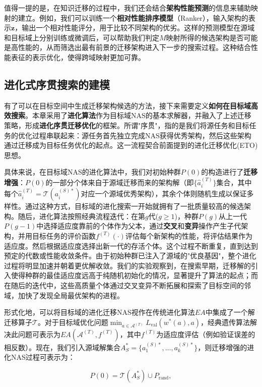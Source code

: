 \documentclass[../main.tex]{subfiles}
\begin{document}
值得一提的是，在知识迁移的过程中，我们还会结合\textbf{架构性能预测}的信息来辅助映射的建立。例如，我们可以训练一个\textbf{相对性能排序模型}（Ranker），输入架构的表示$\mathbf{z}$，输出一个相对性能评分，用于比较不同架构的优劣。这样的预测模型在源域和目标域上分别训练或微调后，可以帮助我们判定$M$映射所得的候选架构是否可能是高性能的，从而筛选出最有前景的迁移架构进入下一步的搜索过程。这种结合性能表征的表示优化，使得跨域映射更加可靠。

\subsection{进化式序贯搜索的建模}

有了可以在目标空间中生成迁移架构候选的方法，接下来需要定义\textbf{如何在目标域高效搜索}。本章采用了\textbf{进化算法}作为目标域NAS的基本求解器，并融入了上述迁移策略，形成\textbf{进化序贯迁移优化}的框架。所谓"序贯"，指的是我们将源任务和目标任务的优化过程串联起来：源任务首先独立完成NAS获得优秀架构，然后这些架构通过迁移成为目标任务优化的起点。这一流程契合前面提到的进化迁移优化(ETO)思想。

具体来说，在目标域NAS的进化算法中，我们对初始种群$P(0)$的构造进行了\textbf{迁移增强}：$P(0)$的一部分个体来自于源域迁移而来的架构解（即$\{\hat{a}^{(T)}_i\}$集合，其中每个$\hat{a}^{(T)}_i = \mathcal{T}(a^{(S)*}_i)$对应一个源域优秀架构），其余个体则随机生成以保证多样性。通过这种方式，目标域的进化搜索一开始就拥有了一批质量较高的候选架构。随后，进化算法按照经典流程迭代：在第$g$代($g\ge1$)，种群$P(g)$从上一代$P(g-1)$中选择适应度靠前的个体作为父本，通过\textbf{交叉}和\textbf{变异}操作产生子代架构，并用目标任务的评价函数$f^{(T)}(\cdot)$评估每个新架构的性能，将评估结果作为适应度。然后根据适应度选择出新一代的存活个体。这个过程不断重复，直到达到预定的代数或性能收敛条件。由于初始种群已注入了源域的"优良基因"，整个进化过程将明显加速并朝着更优解收敛。我们的实验观察到，在搜索早期，迁移解的引入使得种群的最佳适应度远高于纯随机初始化的情况，显著提升了算法的起点；而在随后的迭代中，这些高质量个体通过交叉变异不断拓展和探索了目标空间的邻域，加快了发现全局最优架构的进程。

形式化地，可以将目标域的进化迁移NAS视作在传统进化算法$EA$中集成了一个解迁移算子$\mathcal{T}$。对于目标域优化问题$\min_{a \in \mathcal{A}^{(T)}} L_{\text{val}}(w^*(a), a)$，经典遗传算法解决此问题可表示为$EA(\mathcal{A}^{(T)}, f^{(T)})$，其中$f^{(T)}$为适应度评估（例如验证误差的相反数）。现在，我们引入源域解集合$A^*_S=\{a^{(S)*}_1,\dots,a^{(S)*}_k\}$，则迁移增强的进化NAS过程可表示为：

\begin{equation}
	P(0) = \mathcal{T}(A^*_S) \cup P_{\text{rand}},
\end{equation}
\end{document}
